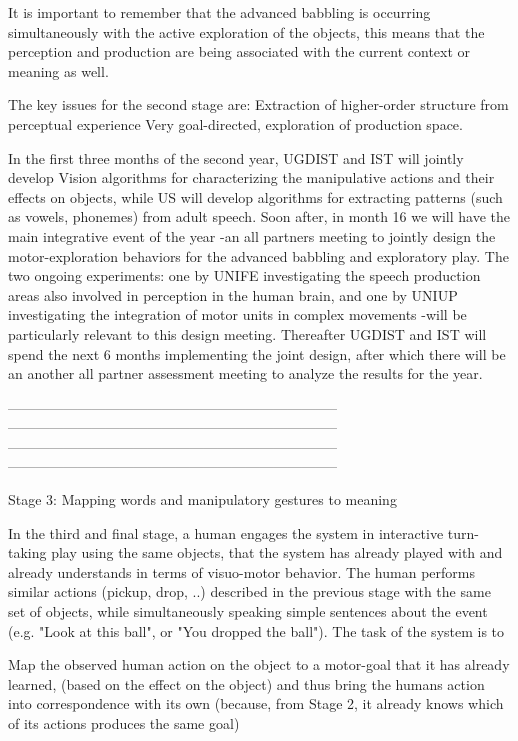 It is important to remember that the advanced babbling is occurring
simultaneously with the active exploration of the objects, this means
that the perception and production are being associated with the
current context or meaning as well.

The key issues for the second stage are:
Extraction of higher-order structure from perceptual experience 
Very goal-directed, exploration of production space. 

In the first three months of the second year, UGDIST and IST will
jointly develop Vision algorithms for characterizing the manipulative
actions and their effects on objects, while US will develop algorithms
for extracting patterns (such as vowels, phonemes) from adult
speech. Soon after, in month 16 we will have the main integrative
event of the year -an all partners meeting to jointly design the
motor-exploration behaviors for the advanced babbling and exploratory
play. The two ongoing experiments: one by UNIFE investigating the
speech production areas also involved in perception in the human
brain, and one by UNIUP investigating the integration of motor units
in complex movements -will be particularly relevant to this design
meeting. Thereafter UGDIST and IST will spend the next 6 months
implementing the joint design, after which there will be an another
all partner assessment meeting to analyze the results for the year.



-----------------------------------------------------------------------
-----------------------------------------------------------------------
-----------------------------------------------------------------------
-----------------------------------------------------------------------


Stage 3: Mapping words and manipulatory gestures to meaning

In the third and final stage, a human engages the system in
interactive turn-taking play using the same objects, that the system
has already played with and already understands in terms of
visuo-motor behavior. The human performs similar actions (pickup,
drop, ..) described in the previous stage with the same set of
objects, while simultaneously speaking simple sentences about the
event (e.g. "Look at this ball", or "You dropped the ball"). The task
of the system is to

Map the observed human action on the object to a motor-goal that it
has already learned, (based on the effect on the object) and thus
bring the humans action into correspondence with its own (because,
from Stage 2, it already knows which of its actions produces the same
goal)

